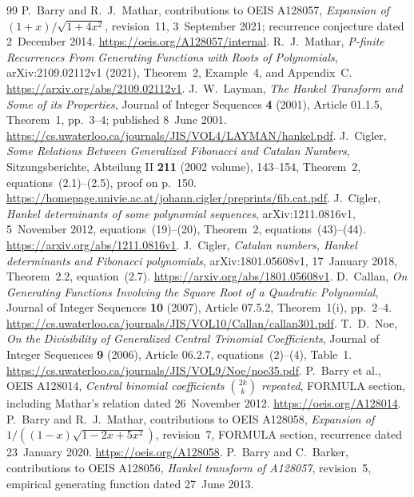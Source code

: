 \documentclass[11pt]{article}
\begin{document}
\begin{thebibliography}{99}
P.~Barry and R.~J.~Mathar, contributions to OEIS A128057,
\emph{Expansion of $(1+x)/\sqrt{1+4x^2}$}, revision~11,
3~September 2021; recurrence conjecture dated 2~December 2014.
\url{https://oeis.org/A128057/internal}.
R.~J.~Mathar, \emph{P-finite Recurrences From Generating Functions with
Roots of Polynomials}, arXiv:2109.02112v1 (2021),
Theorem~2, Example~4, and Appendix~C.
\url{https://arxiv.org/abs/2109.02112v1}.
J.~W.~Layman, \emph{The Hankel Transform and Some of its Properties},
Journal of Integer Sequences \textbf{4} (2001), Article 01.1.5,
Theorem~1, pp.~3--4; published 8~June 2001.
\url{https://cs.uwaterloo.ca/journals/JIS/VOL4/LAYMAN/hankel.pdf}.
J.~Cigler, \emph{Some Relations Between Generalized Fibonacci and Catalan
Numbers}, Sitzungsberichte, Abteilung II \textbf{211} (2002 volume),
143--154, Theorem~2, equations~(2.1)--(2.5), proof on p.~150.
\url{https://homepage.univie.ac.at/johann.cigler/preprints/fib.cat.pdf}.
J.~Cigler, \emph{Hankel determinants of some polynomial sequences},
arXiv:1211.0816v1, 5~November 2012, equations~(19)--(20),
Theorem~2, equations~(43)--(44).
\url{https://arxiv.org/abs/1211.0816v1}.
J.~Cigler, \emph{Catalan numbers, Hankel determinants and Fibonacci polynomials},
arXiv:1801.05608v1, 17~January 2018, Theorem~2.2, equation~(2.7).
\url{https://arxiv.org/abs/1801.05608v1}.
D.~Callan, \emph{On Generating Functions Involving the Square Root of a
Quadratic Polynomial}, Journal of Integer Sequences \textbf{10} (2007),
Article 07.5.2, Theorem~1(i), pp.~2--4.
\url{https://cs.uwaterloo.ca/journals/JIS/VOL10/Callan/callan301.pdf}.
T.~D.~Noe, \emph{On the Divisibility of Generalized Central Trinomial
Coefficients}, Journal of Integer Sequences \textbf{9} (2006),
Article 06.2.7, equations~(2)--(4), Table~1.
\url{https://cs.uwaterloo.ca/journals/JIS/VOL9/Noe/noe35.pdf}.
P.~Barry et al., OEIS A128014,
\emph{Central binomial coefficients $\binom{2k}{k}$ repeated},
FORMULA section, including Mathar's relation dated 26~November 2012.
\url{https://oeis.org/A128014}.
P.~Barry and R.~J.~Mathar, contributions to OEIS A128058,
\emph{Expansion of $1/((1-x)\sqrt{1-2x+5x^2})$}, revision~7,
FORMULA section, recurrence dated 23~January 2020.
\url{https://oeis.org/A128058}.
P.~Barry and C.~Barker, contributions to OEIS A128056,
\emph{Hankel transform of A128057}, revision~5,
empirical generating function dated 27~June 2013.

\end{thebibliography}
\end{document}
